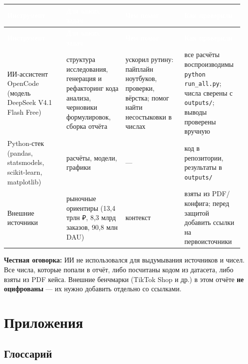 \documentclass[10pt,a4paper]{article}
\begin{document}
\begingroup
\small
\setlength{\tabcolsep}{3pt}
\renewcommand{\arraystretch}{1.12}
\begin{longtable}{@{}>{\raggedright\arraybackslash}p{0.2408\linewidth}>{\raggedright\arraybackslash}p{0.2408\linewidth}>{\raggedright\arraybackslash}p{0.2408\linewidth}>{\raggedright\arraybackslash}p{0.2408\linewidth}@{}}
\rowcolor{blue}
\textcolor{white}{\textbf{Инструмент}} & \textcolor{white}{\textbf{Для каких задач}} & \textcolor{white}{\textbf{Чем помог}} & \textcolor{white}{\textbf{Как проверили}} \\
\endfirsthead
\rowcolor{blue}
\textcolor{white}{\textbf{Инструмент}} & \textcolor{white}{\textbf{Для каких задач}} & \textcolor{white}{\textbf{Чем помог}} & \textcolor{white}{\textbf{Как проверили}} \\
\endhead
\hline
ИИ-ассистент OpenCode (модель DeepSeek V4.1 Flash Free) & структура исследования, генерация и рефакторинг кода анализа, черновики формулировок, сборка отчёта & ускорил рутину: пайплайн ноутбуков, проверки, вёрстка; помог найти несостыковки в числах & все расчёты воспроизводимы \texttt{python run\_all.py}; числа сверены с \texttt{outputs/}; выводы проверены вручную \\
Python-стек (pandas, statsmodels, scikit-learn, matplotlib) & расчёты, модели, графики & — & код в репозитории, результаты в \texttt{outputs/} \\
Внешние источники & рыночные ориентиры (13,4 трлн ₽, 8,3 млрд заказов, 90,8 млн DAU) & контекст & взяты из PDF/конфига; перед защитой добавить ссылки на первоисточники \\
\hline
\end{longtable}
\endgroup
\vspace{4pt}

\textbf{Честная оговорка:} ИИ не использовался для выдумывания источников и чисел. Все числа, которые попали в отчёт, либо посчитаны кодом из датасета, либо взяты из PDF кейса. Внешние бенчмарки (TikTok Shop и др.) в этом отчёте \textbf{не оцифрованы} — их нужно добавить отдельно со ссылками.\par

\clearpage

\section{Приложения}

\subsection{Глоссарий}
\end{document}
